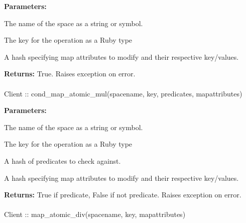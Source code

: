 \noindent\textbf{Parameters:}
\begin{description}[labelindent=\widthof{{\code{mapattributes}}},leftmargin=*,noitemsep,nolistsep,align=right]
\item[\code{spacename}] The name of the space as a string or symbol.
\item[\code{key}] The key for the operation as a Ruby type
\item[\code{mapattributes}] A hash specifying map attributes to modify and their respective key/values.
\end{description}

\noindent\textbf{Returns:}
True.  Raises exception on error.

\paragraph{}
\begin{ccode}
Client :: cond_map_atomic_mul(spacename, key, predicates, mapattributes)
\end{ccode}
\funcdesc 

\noindent\textbf{Parameters:}
\begin{description}[labelindent=\widthof{{\code{mapattributes}}},leftmargin=*,noitemsep,nolistsep,align=right]
\item[\code{spacename}] The name of the space as a string or symbol.
\item[\code{key}] The key for the operation as a Ruby type
\item[\code{predicates}] A hash of predicates to check against.
\item[\code{mapattributes}] A hash specifying map attributes to modify and their respective key/values.
\end{description}

\noindent\textbf{Returns:}
True if predicate, False if not predicate.  Raises exception on error.

\paragraph{}
\begin{ccode}
Client :: map_atomic_div(spacename, key, mapattributes)
\end{ccode}
\funcdesc 

